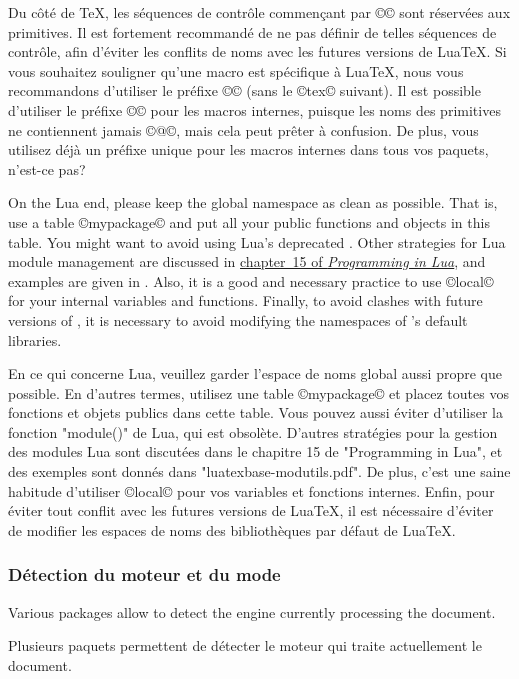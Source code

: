 \documentclass{lltxdoc}
\begin{document}
Du côté de TeX, les séquences de contrôle commençant par ©\luatex© sont réservées aux primitives. Il est fortement recommandé de ne pas définir de telles séquences de contrôle, afin d'éviter les conflits de noms avec les futures versions de LuaTeX. Si vous souhaitez souligner qu'une macro est spécifique à LuaTeX, nous vous recommandons d'utiliser le préfixe ©\lua© (sans le ©tex© suivant). Il est possible d'utiliser le préfixe ©\luatex@© pour les macros internes, puisque les noms des primitives ne contiennent jamais ©@©, mais cela peut prêter à confusion. De plus, vous utilisez déjà un préfixe unique pour les macros internes dans tous vos paquets, n'est-ce pas?

On the Lua end, please keep the global namespace as clean as possible. That
is, use a table ©mypackage© and put all your public functions and objects in
this table. You might want to avoid using Lua's deprecated .
Other strategies for Lua module management are discussed in
\href{http://www.lua.org/pil/15.html}{chapter~15 of \emph{Programming in
Lua}}, and examples are given in . Also, it
is a good and necessary practice to use ©local© for your internal variables and
functions. Finally, to avoid clashes with future versions of \luatex, it is
necessary to avoid modifying the namespaces of \luatex's default libraries.

En ce qui concerne Lua, veuillez garder l'espace de noms global aussi propre que possible. En d'autres termes, utilisez une table ©mypackage© et placez toutes vos fonctions et objets publics dans cette table. Vous pouvez aussi éviter d'utiliser la fonction "module()" de Lua, qui est obsolète. D'autres stratégies pour la gestion des modules Lua sont discutées dans le chapitre 15 de "Programming in Lua", et des exemples sont donnés dans "luatexbase-modutils.pdf". De plus, c'est une saine habitude d'utiliser ©local© pour vos variables et fonctions internes. Enfin, pour éviter tout conflit avec les futures versions de LuaTeX, il est nécessaire d'éviter de modifier les espaces de noms des bibliothèques par défaut de LuaTeX.

\subsubsection{Détection du moteur et du mode}\label{detect}

Various packages allow to detect the engine currently processing the document.

Plusieurs paquets permettent de détecter le moteur qui traite actuellement le document.
\end{document}
